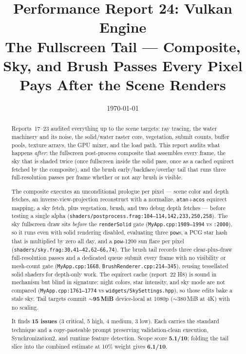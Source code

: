 \documentclass[11pt,a4paper]{article}
\title{Performance Report 24: Vulkan Engine \\
\large The Fullscreen Tail --- Composite, Sky, and Brush Passes Every Pixel Pays After the Scene Renders}
\author{}
\date{\today}
\begin{document}
\maketitle

\begin{abstract}
Reports~17--23 audited everything up to the scene targets: ray tracing, the
water machinery and its noise, the solid/water raster core, vegetation,
submit counts, buffer pools, texture arrays, the GPU mixer, and the load
path. This report audits what happens \emph{after}: the fullscreen
post-process composite that assembles every frame, the sky that is shaded
twice (once fullscreen inside the solid pass, once as a cached equirect
fetched by the composite), and the brush early/backface/overlay tail that
runs three full-resolution passes per frame whether or not any brush is
visible.

The composite executes an unconditional prologue per pixel --- scene color
and depth fetches, an inverse-view-projection reconstruct with a normalize,
\texttt{atan}+\texttt{acos} equirect mapping, a sky fetch, plus vegetation,
brush, and two debug depth fetches --- before testing a single alpha
(\texttt{shaders/postprocess.frag:104--114,142,233,250,258}). The sky
fullscreen draw sits \emph{before} the \texttt{renderSolid} gate
(\texttt{MyApp.cpp:1989--1994} vs \texttt{:2000}), so it runs even with solid
rendering disabled, evaluating three \texttt{pow}s, a PCG star hash that is
multiplied by zero all day, and a \texttt{pow}-1200 sun flare per pixel
(\texttt{shaders/sky.frag:30,41--42,62--66,74}). The brush tail records three
clear-plus-draw full-resolution passes and a dedicated queue submit every
frame with no visibility or mesh-count gate (\texttt{MyApp.cpp:1668},
\texttt{BrushRenderer.cpp:214--345}), reusing tessellated solid shaders for
depth-only work. The equirect cache (report~22 H8) is sound in mechanism but
blind in signature: night colors, star intensity, and sky mode are not
compared (\texttt{MyApp.cpp:1761--1774} vs
\texttt{widgets/SkySettings.hpp}), so those edits bake a stale sky. Tail
targets commit \textbf{$\sim$95\,MiB} device-local at 1080p ($\sim$380\,MiB
at 4K) with no scaling.

It finds \textbf{15 issues} (3 critical, 5 high, 4 medium, 3 low). Each
carries the standard technique and a copy-pasteable prompt preserving
validation-clean execution, Synchronization2, and runtime feature detection.
Scope score \textbf{5.1/10}; folding the tail slice into the combined
estimate at 10\% weight gives \textbf{6.1/10}.
\end{abstract}
\end{document}

